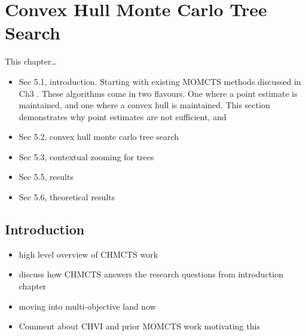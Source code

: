 

\chapter{\label{ch:5-chmcts}Convex Hull Monte Carlo Tree Search} 

    \minitoc



    
    This chapter\dots

    \begin{itemize}
        \item Sec 5.1, introduction. Starting with existing MOMCTS methods discussed in Ch3 . These algorithms come in two flavours. One where a point estimate is maintained, and one where a convex hull is maintained. This section demonstrates why point estimates are not sufficient, and 
        \item Sec 5.2, convex hull monte carlo tree search
        \item Sec 5.3, contextual zooming for trees
        \item Sec 5.5, results
        \item Sec 5.6, theoretical results
    \end{itemize}



\section{Introduction}
\label{sec:5-1-intro}

    \begin{itemize}
        \item high level overview of CHMCTS work
        \item discuss how CHMCTS answers the research questions from introduction chapter
        \item moving into multi-objective land now
        \item Comment about CHVI and prior MOMCTS work motivating this
    \end{itemize} 
    
